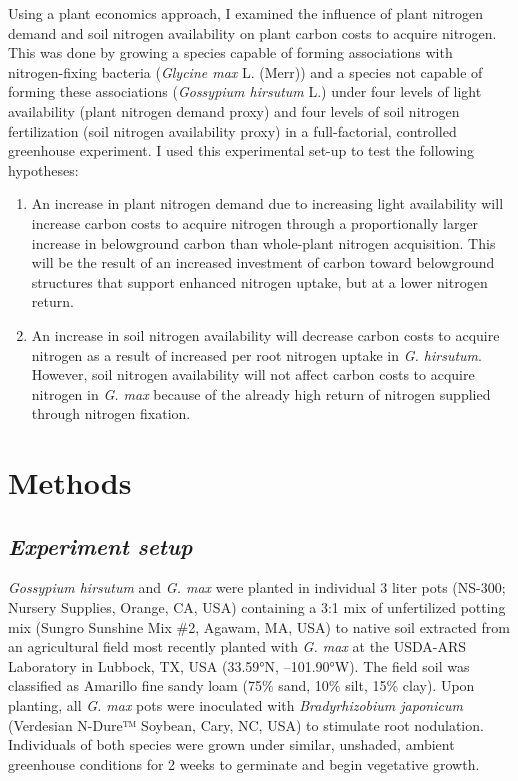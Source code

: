 Using a plant economics approach, I examined the influence of plant nitrogen demand and soil nitrogen availability on plant carbon costs to acquire nitrogen. This was done by growing a species capable of forming associations with nitrogen-fixing bacteria (\textit{Glycine max} L. (Merr)) and a species not capable of forming these associations (\textit{Gossypium hirsutum} L.) under four levels of light availability (plant nitrogen demand proxy) and four levels of soil nitrogen fertilization (soil nitrogen availability proxy) in a full-factorial, controlled greenhouse experiment. I used this experimental set-up to test the following hypotheses:
\begin{enumerate}
\item An increase in plant nitrogen demand due to increasing light availability will increase carbon costs to acquire nitrogen through a proportionally larger increase in belowground carbon than whole-plant nitrogen acquisition. This will be the result of an increased investment of carbon toward belowground structures that support enhanced nitrogen uptake, but at a lower nitrogen return. 

\item An increase in soil nitrogen availability will decrease carbon costs to acquire nitrogen as a result of increased per root nitrogen uptake in \textit{G. hirsutum}. However, soil nitrogen availability will not affect carbon costs to acquire nitrogen in \textit{G. max} because of the already high return of nitrogen supplied through nitrogen fixation.
\end{enumerate}

\section{Methods}
\subsection{\textit{Experiment setup}}
\noindent \textit{Gossypium hirsutum} and \textit{G. max} were planted in individual 3 liter pots (NS-300; Nursery Supplies, Orange, CA, USA) containing a 3:1 mix of unfertilized potting mix (Sungro Sunshine Mix \#2, Agawam, MA, USA) to native soil extracted from an agricultural field most recently planted with \textit{G. max} at the USDA-ARS Laboratory in Lubbock, TX, USA (33.59°N, –101.90°W). The field soil was classified as Amarillo fine sandy loam (75\% sand, 10\% silt, 15\% clay). Upon planting, all \textit{G. max} pots were inoculated with \textit{Bradyrhizobium japonicum} (Verdesian N-Dure™ Soybean, Cary, NC, USA) to stimulate root nodulation. Individuals of both species were grown under similar, unshaded, ambient greenhouse conditions for 2 weeks to germinate and begin vegetative growth. 

